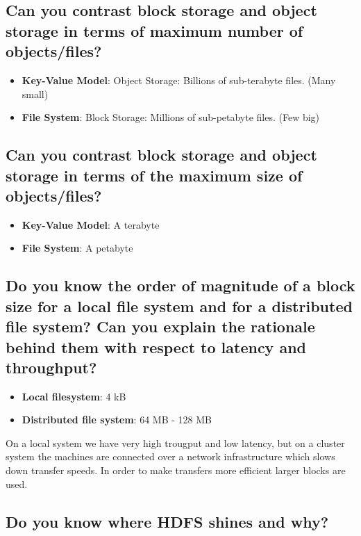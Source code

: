 \documentclass{article}
\begin{document}
\subsection{Can you contrast block storage and object storage in terms of maximum number of objects/files?}

\begin{itemize}
    \item \textbf{Key-Value Model}: Object Storage: Billions of sub-terabyte files. (Many small)
    \item \textbf{File System}: Block Storage: Millions of sub-petabyte files. (Few big)
\end{itemize}

\subsection{Can you contrast block storage and object storage in terms of the maximum size of objects/files?}

\begin{itemize}
    \item \textbf{Key-Value Model}: A terabyte
    \item \textbf{File System}: A petabyte
\end{itemize}

\subsection{Do you know the order of magnitude of a block size for a local file system and for a distributed file system? Can you explain the rationale behind them with respect to latency and throughput?}

\begin{itemize}
    \item \textbf{Local filesystem}: 4 kB
    \item \textbf{Distributed file system}: 64 MB - 128 MB
\end{itemize}

On a local system we have very high trougput and low latency, but on a cluster system the machines are connected over a network infrastructure which slows down transfer speeds. In order to make transfers more efficient larger blocks are used.

\subsection{Do you know where HDFS shines and why?}
\end{document}
